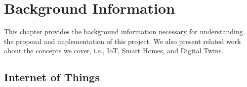 \chapter{Background Information}

This chapter provides the background information necessary for understanding the proposal and implementation of this project. We also present related work about the concepts we cover, i.e., IoT, Smart Homes, and Digital Twins. 

\section{Internet of Things}


% 
% 
% 

